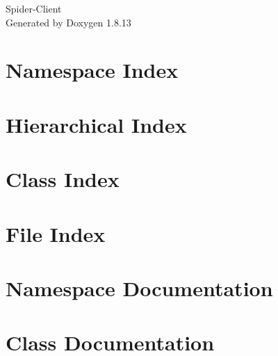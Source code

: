 \documentclass[twoside]{book}
\newcommand{\+}{\discretionary{\mbox{\scriptsize$\hookleftarrow$}}{}{}}
\newcommand{\clearemptydoublepage}{%
  \newpage{\pagestyle{empty}\cleardoublepage}%
}
\begin{document}
\hypersetup{pageanchor=false,
             bookmarksnumbered=true,
             pdfencoding=unicode
            }
\begin{titlepage}
\vspace*{7cm}
\begin{center}%
{\Large Spider-\/\+Client }\\
\vspace*{1cm}
{\large Generated by Doxygen 1.8.13}\\
\end{center}
\end{titlepage}
\clearemptydoublepage
{}
\tableofcontents
\clearemptydoublepage
{}
\hypersetup{pageanchor=true}

\chapter{Namespace Index}

\chapter{Hierarchical Index}

\chapter{Class Index}

\chapter{File Index}

\chapter{Namespace Documentation}


\chapter{Class Documentation}























\end{document}
